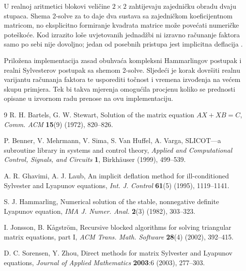 \documentclass[12pt,a4paper]{article}
\begin{document}
U realnoj aritmetici blokovi veličine $2\times 2$ zahtijevaju zajedničku obradu dvaju stupaca. Shema 2-solve za to daje dva sustava sa zajedničkom koeficijentnom matricom, no eksplicitno formiranje kvadrata matrice može povećati numeričke poteškoće. Kod izrazito loše uvjetovanih jednadžbi ni izravno računanje faktora samo po sebi nije dovoljno; jedan od posebnih pristupa jest implicitna deflacija \cite{ghavimi}.

Priložena implementacija zasad obuhvaća kompleksni Hammarlingov postupak i realni Sylvesterov postupak sa shemom 2-solve. Sljedeći je korak dovršiti realnu varijantu računanja faktora te usporediti točnost i vremena izvođenja na većem skupu primjera. Tek bi takva mjerenja omogućila procjenu koliko se prednosti opisane u izvornom radu prenose na ovu implementaciju.

\begin{thebibliography}{9}
R. H. Bartels, G. W. Stewart, Solution of the matrix equation $AX + XB = C$, \emph{Comm. ACM} \textbf{15}(9) (1972), 820--826.

P. Benner, V. Mehrmann, V. Sima, S. Van Huffel, A. Varga, SLICOT---a subroutine library in systems and control theory, \emph{Applied and Computational Control, Signals, and Circuits} \textbf{1}, Birkhäuser (1999), 499--539.

A. R. Ghavimi, A. J. Laub, An implicit deflation method for ill-conditioned Sylvester and Lyapunov equations, \emph{Int. J. Control} \textbf{61}(5) (1995), 1119--1141.

S. J. Hammarling, Numerical solution of the stable, nonnegative definite Lyapunov equation, \emph{IMA J. Numer. Anal.} \textbf{2}(3) (1982), 303--323.

I. Jonsson, B. Kågström, Recursive blocked algorithms for solving triangular matrix equations, part I, \emph{ACM Trans. Math. Software} \textbf{28}(4) (2002), 392--415.

D. C. Sorensen, Y. Zhou, Direct methods for matrix Sylvester and Lyapunov equations, \emph{Journal of Applied Mathematics} \textbf{2003}:6 (2003), 277--303.
\end{thebibliography}
\end{document}
